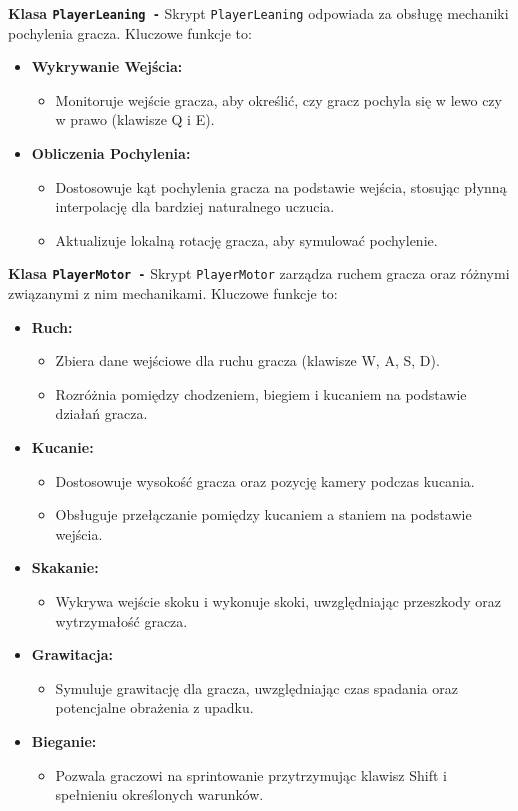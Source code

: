 \textbf{Klasa \texttt{PlayerLeaning -}}
Skrypt \texttt{PlayerLeaning} odpowiada za obsługę mechaniki pochylenia gracza. Kluczowe funkcje to:
\begin{itemize}
  \item \textbf{Wykrywanie Wejścia:}
    \begin{itemize}
      \item Monitoruje wejście gracza, aby określić, czy gracz pochyla się w lewo czy w prawo (klawisze Q i E).
    \end{itemize}
  \item \textbf{Obliczenia Pochylenia:}
    \begin{itemize}
      \item Dostosowuje kąt pochylenia gracza na podstawie wejścia, stosując płynną interpolację dla bardziej naturalnego uczucia.
      \item Aktualizuje lokalną rotację gracza, aby symulować pochylenie.
    \end{itemize}
\end{itemize}

\textbf{Klasa \texttt{PlayerMotor -}}
Skrypt \texttt{PlayerMotor} zarządza ruchem gracza oraz różnymi związanymi z nim mechanikami. Kluczowe funkcje to:
\begin{itemize}
  \item \textbf{Ruch:}
    \begin{itemize}
      \item Zbiera dane wejściowe dla ruchu gracza (klawisze W, A, S, D).
      \item Rozróżnia pomiędzy chodzeniem, biegiem i kucaniem na podstawie działań gracza.
    \end{itemize}
  \item \textbf{Kucanie:}
    \begin{itemize}
      \item Dostosowuje wysokość gracza oraz pozycję kamery podczas kucania.
      \item Obsługuje przełączanie pomiędzy kucaniem a staniem na podstawie wejścia.
    \end{itemize}
  \item \textbf{Skakanie:}
    \begin{itemize}
      \item Wykrywa wejście skoku i wykonuje skoki, uwzględniając przeszkody oraz wytrzymałość gracza.
    \end{itemize}
  \item \textbf{Grawitacja:}
    \begin{itemize}
      \item Symuluje grawitację dla gracza, uwzględniając czas spadania oraz potencjalne obrażenia z upadku.
    \end{itemize}
  \item \textbf{Bieganie:}
    \begin{itemize}
      \item Pozwala graczowi na sprintowanie przytrzymując klawisz Shift i spełnieniu określonych warunków.
    \end{itemize}
\end{itemize}

